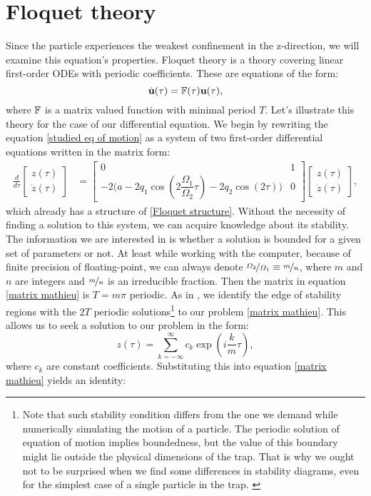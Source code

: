 \section{Floquet theory}
\label{sec:floquet}

Since the particle experiences the weakest confinement in the z-direction, we will examine this equation's properties. Floquet theory is a theory covering linear first-order ODEs with periodic coefficients. These are equations of the form:
\begin{equation}
	\label{Floquet structure}
	\dot{\vb{u}}(\tau) = \mathbb{F}(\tau) \vb{u}(\tau),
\end{equation}
where $\mathbb{F}$ is a matrix valued function with minimal period $T$. Let's illustrate this theory for the case of our differential equation. We begin by rewriting the equation \eqref{studied eq of motion} as a system of two first-order differential equations written in the matrix form:
\begin{align}
\label{matrix mathieu}
	\frac{d}{d \tau}
	\begin{bmatrix}
		z(\tau) \\
		\dot{z}(\tau)
	\end{bmatrix}	
	&=
	\begin{bmatrix}
		0 & 1 \\
		-2\bigg( a - 2 q_1 \cos\left(2\dfrac{\Omega_1}{\Omega_2} \tau \right) - 2 q_2 \cos(2\tau) \bigg) & 0	
	\end{bmatrix}
	\begin{bmatrix}
		z(\tau) \\
		\dot{z}(\tau)
	\end{bmatrix},
\end{align}
which already has a structure of \eqref{Floquet structure}. Without the necessity of finding a solution to this system, we can acquire knowledge about its stability. The information we are interested in is whether a solution is bounded for a given set of parameters or not. At least while working with the computer, because of finite precision of floating-point, we can always denote $\nicefrac{\Omega_2}{\Omega_1} \equiv \nicefrac{m}{n}$, where $m$ and $n$ are integers and $\nicefrac{m}{n}$ is an irreducible fraction. Then the matrix in equation \eqref{matrix mathieu} is $T = m \pi$ periodic. As in \cite{leefer2017investigation}, we identify the edge of stability regions with the $2T$ periodic solutions\footnote{Note that such stability condition differs from the one we demand while numerically simulating the motion of a particle. The periodic solution of equation of motion implies boundedness, but the value of this boundary might lie outside the physical dimensions of the trap. That is why we ought not to be surprised when we find some differences in stability diagrams, even for the simplest case of a single particle in the trap. \label{foot: different stability condition}} to our problem \eqref{matrix mathieu}. This allows us to seek a solution to our problem in the form:
\begin{equation}
	\label{Floquet ansatz}
	z(\tau) = \sum_{k=-\infty}^{\infty} c_k \exp(i\frac{k}{m}\tau),
\end{equation}
where $c_k$ are constant coefficients. Substituting this into equation \eqref{matrix mathieu} yields an identity:

